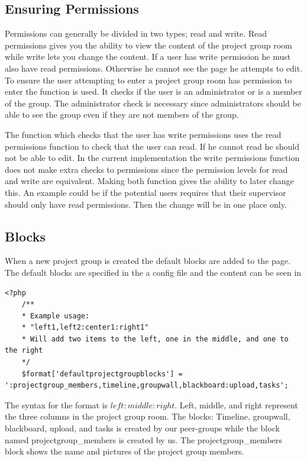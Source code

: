 \FloatBarrier
\subsection{Ensuring Permissions}
\label{sec:projectgrouproommanagerights}
Permissions can generally be divided in two types; read and write. 
Read permissions gives you the ability to view the content of the project group room while write lets you change the content. 
If a user has write permission he must also have read permissions. 
Otherwise he cannot see the page he attempts to edit. 
To ensure the user attempting to enter a project group room has permission to enter the function  is used. 
It checks if the user is an administrator or is a member of the group. 
The administrator check is necessary since administrators should be able to see the group even if they are not members of the group. 

The function   which checks that the user has write permissions uses the read permissions function to check that the user can read.
If he cannot read he should not be able to edit. 
In the current implementation the write permissions function does not make extra checks to permissions since the permission levels for read and write are equivalent.
Making both function gives the ability to later change this.
An example could be if the potential users requires that their supervisor should only have read permissions. 
Then the change will be in one place only. 

\subsection{Blocks}
\label{sec:implprojectgroupblocks}
When a new project group is created the default blocks are added to the page. 
The default blocks are specified in the a config file and the content can be seen in 


\begin{lstlisting}[style=phpCode, caption=\myCaption{The default block configuration}, label=moodledaultblock]
<?php
	/**
	* Example usage:
	* "left1,left2:center1:right1"
	* Will add two items to the left, one in the middle, and one to the right
	*/
	$format['defaultprojectgroupblocks'] = ':projectgroup_members,timeline,groupwall,blackboard:upload,tasks';
\end{lstlisting}
The syntax for the format is $left:middle:right$. 
Left, middle, and right represent the three columns in the project group room. 
The blocks: Timeline, groupwall, blackboard, upload, and tasks is created by our peer-groups while the block named projectgroup\_members is created by us. 
The projectgroup\_members block shows the name and pictures of the project group members. 

